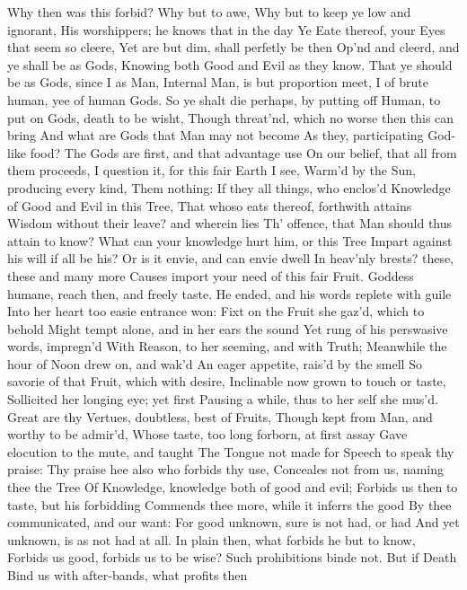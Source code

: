 \documentclass[11pt]{book}
\newcounter {first}
\begin{document}
Why then was this forbid?  Why but to awe, 
Why but to keep ye low and ignorant, 
His worshippers; he knows that in the day 
Ye Eate thereof, your Eyes that seem so cleere, 
Yet are but dim, shall perfetly be then 
Op'nd and cleerd, and ye shall be as Gods, 
Knowing both Good and Evil as they know. 
That ye should be as Gods, since I as Man, 
Internal Man, is but proportion meet, 
I of brute human, yee of human Gods. 
So ye shalt die perhaps, by putting off 
Human, to put on Gods, death to be wisht, 
Though threat'nd, which no worse then this can bring 
And what are Gods that Man may not become 
As they, participating God-like food? 
The Gods are first, and that advantage use 
On our belief, that all from them proceeds, 
I question it, for this fair Earth I see, 
Warm'd by the Sun, producing every kind, 
Them nothing: If they all things, who enclos'd 
Knowledge of Good and Evil in this Tree, 
That whoso eats thereof, forthwith attains 
Wisdom without their leave? and wherein lies 
Th' offence, that Man should thus attain to know? 
What can your knowledge hurt him, or this Tree 
Impart against his will if all be his? 
Or is it envie, and can envie dwell 
In heav'nly brests? these, these and many more 
Causes import your need of this fair Fruit. 
Goddess humane, reach then, and freely taste. 
\quad He ended, and his words replete with guile 
Into her heart too easie entrance won: 
Fixt on the Fruit she gaz'd, which to behold 
Might tempt alone, and in her ears the sound 
Yet rung of his perswasive words, impregn'd 
With Reason, to her seeming, and with Truth; 
Meanwhile the hour of Noon drew on, and wak'd 
An eager appetite, rais'd by the smell 
So savorie of that Fruit, which with desire, 
Inclinable now grown to touch or taste, 
Sollicited her longing eye; yet first 
Pausing a while, thus to her self she mus'd. 
\quad Great are thy Vertues, doubtless, best of Fruits, 
Though kept from Man, and worthy to be admir'd, 
Whose taste, too long forborn, at first assay 
Gave elocution to the mute, and taught 
The Tongue not made for Speech to speak thy praise: 
Thy praise hee also who forbids thy use, 
Conceales not from us, naming thee the Tree 
Of Knowledge, knowledge both of good and evil; 
Forbids us then to taste, but his forbidding 
Commends thee more, while it inferrs the good 
By thee communicated, and our want: 
For good unknown, sure is not had, or had 
And yet unknown, is as not had at all. 
In plain then, what forbids he but to know, 
Forbids us good, forbids us to be wise? 
Such prohibitions binde not.  But if Death 
Bind us with after-bands, what profits then 
\end{document}
